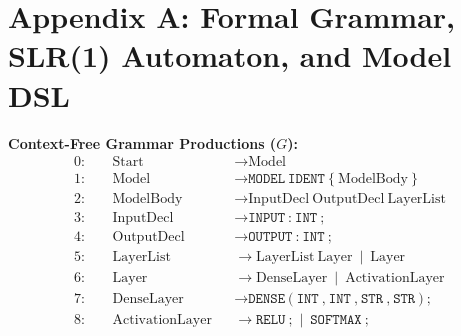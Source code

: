 \documentclass[11pt,a4paper]{article}
\begin{document}
\newpage
\appendix

\section{Appendix A: Formal Grammar, SLR(1) Automaton, and Model DSL}
\label{app:grammar}
\label{app:slr_table}
\label{app:model_source}

\noindent
\begin{minipage}[t]{0.56\linewidth}
\footnotesize
\textbf{Context-Free Grammar Productions ($G$):}
\begin{align*}
0: \quad &\text{Start}           &&\rightarrow \text{Model} \\
1: \quad &\text{Model}           &&\rightarrow \texttt{MODEL} \ \texttt{IDENT} \ \texttt{\{} \ \text{ModelBody} \ \texttt{\}} \\
2: \quad &\text{ModelBody}       &&\rightarrow \text{InputDecl} \ \text{OutputDecl} \ \text{LayerList} \\
3: \quad &\text{InputDecl}       &&\rightarrow \texttt{INPUT} \ \texttt{:} \ \texttt{INT} \ \texttt{;} \\
4: \quad &\text{OutputDecl}      &&\rightarrow \texttt{OUTPUT} \ \texttt{:} \ \texttt{INT} \ \texttt{;} \\
5: \quad &\text{LayerList}       &&\rightarrow \text{LayerList} \ \text{Layer} \ \mid \ \text{Layer} \\
6: \quad &\text{Layer}           &&\rightarrow \text{DenseLayer} \ \mid \ \text{ActivationLayer} \\
7: \quad &\text{DenseLayer}      &&\rightarrow \texttt{DENSE} \ \texttt{(} \ \texttt{INT} \ \texttt{,} \ \texttt{INT} \ \texttt{,} \ \texttt{STR} \ \texttt{,} \ \texttt{STR} \ \texttt{)} \ \texttt{;} \\
8: \quad &\text{ActivationLayer} &&\rightarrow \texttt{RELU} \ \texttt{;} \ \mid \ \texttt{SOFTMAX} \ \texttt{;}
\end{align*}
\end{minipage}\hfill
\end{document}
